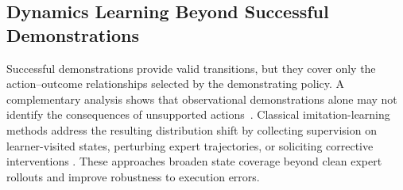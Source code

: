 

\subsection{Dynamics Learning Beyond Successful Demonstrations}

Successful demonstrations provide valid transitions, but they cover only the
action--outcome relationships selected by the demonstrating policy. A
complementary analysis shows that observational demonstrations alone may not
identify the consequences of unsupported actions~\cite{yu2026capability}.
Classical imitation-learning methods address the resulting distribution shift
by collecting supervision on learner-visited states, perturbing expert
trajectories, or soliciting corrective interventions
\cite{ross2011reduction,laskey2017dart,mandlekar2020human,hu2026rac,
intelligence2025pi}. These approaches broaden state coverage beyond clean
expert rollouts and improve robustness to execution errors.

